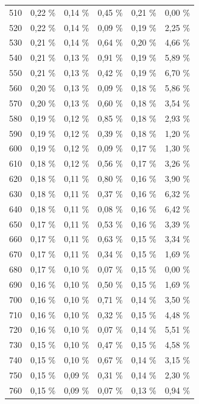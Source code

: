 \documentclass[11pt,twoside,a4paper]{report}
\begin{document}
{\begin{longtable}{rrrrrr}
    510   & 0,22 \% & 0,14 \% & 0,45 \% & 0,21 \% & 0,00 \% \\
    520   & 0,22 \% & 0,14 \% & 0,09 \% & 0,19 \% & 2,25 \% \\
    530   & 0,21 \% & 0,14 \% & 0,64 \% & 0,20 \% & 4,66 \% \\
    540   & 0,21 \% & 0,13 \% & 0,91 \% & 0,19 \% & 5,89 \% \\
    550   & 0,21 \% & 0,13 \% & 0,42 \% & 0,19 \% & 6,70 \% \\
    560   & 0,20 \% & 0,13 \% & 0,09 \% & 0,18 \% & 5,86 \% \\
    570   & 0,20 \% & 0,13 \% & 0,60 \% & 0,18 \% & 3,54 \% \\
    580   & 0,19 \% & 0,12 \% & 0,85 \% & 0,18 \% & 2,93 \% \\
    590   & 0,19 \% & 0,12 \% & 0,39 \% & 0,18 \% & 1,20 \% \\
    600   & 0,19 \% & 0,12 \% & 0,09 \% & 0,17 \% & 1,30 \% \\
    610   & 0,18 \% & 0,12 \% & 0,56 \% & 0,17 \% & 3,26 \% \\
    620   & 0,18 \% & 0,11 \% & 0,80 \% & 0,16 \% & 3,90 \% \\
    630   & 0,18 \% & 0,11 \% & 0,37 \% & 0,16 \% & 6,32 \% \\
    640   & 0,18 \% & 0,11 \% & 0,08 \% & 0,16 \% & 6,42 \% \\
    650   & 0,17 \% & 0,11 \% & 0,53 \% & 0,16 \% & 3,39 \% \\
    660   & 0,17 \% & 0,11 \% & 0,63 \% & 0,15 \% & 3,34 \% \\
    670   & 0,17 \% & 0,11 \% & 0,34 \% & 0,15 \% & 1,69 \% \\
    680   & 0,17 \% & 0,10 \% & 0,07 \% & 0,15 \% & 0,00 \% \\
    690   & 0,16 \% & 0,10 \% & 0,50 \% & 0,15 \% & 1,69 \% \\
    700   & 0,16 \% & 0,10 \% & 0,71 \% & 0,14 \% & 3,50 \% \\
    710   & 0,16 \% & 0,10 \% & 0,32 \% & 0,15 \% & 4,48 \% \\
    720   & 0,16 \% & 0,10 \% & 0,07 \% & 0,14 \% & 5,51 \% \\
    730   & 0,15 \% & 0,10 \% & 0,47 \% & 0,15 \% & 4,58 \% \\
    740   & 0,15 \% & 0,10 \% & 0,67 \% & 0,14 \% & 3,15 \% \\
    750   & 0,15 \% & 0,09 \% & 0,31 \% & 0,14 \% & 2,30 \% \\
    760   & 0,15 \% & 0,09 \% & 0,07 \% & 0,13 \% & 0,94 \% \\

\end{longtable}}
\end{document}
